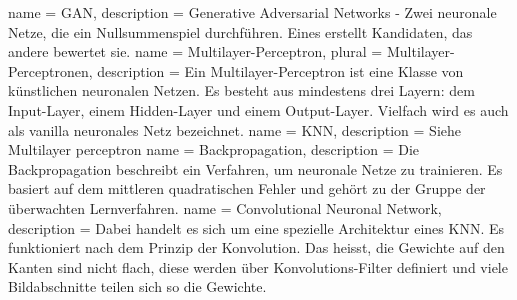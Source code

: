  {
    name = {GAN},
    description = {Generative Adversarial Networks - Zwei neuronale Netze, die ein Nullsummenspiel durchführen.
    Eines erstellt Kandidaten, das andere bewertet sie.\cite{wiki:gan}}
}
 {
    name = {Multilayer-Perceptron},
    plural = {Multilayer-Perceptronen},
    description = {Ein Multilayer-Perceptron ist eine Klasse von künstlichen neuronalen Netzen. Es besteht aus mindestens
    drei Layern: dem Input-Layer, einem Hidden-Layer und einem Output-Layer. Vielfach wird es auch als \glqq vanilla\grqq{}
        neuronales Netz bezeichnet.\cite{wiki:multilayerPerceptron}}
}
 {
    name = {KNN},
    description = {Siehe \Gls{Multilayer perceptron}}
}
 {
    name = {Backpropagation},
    description = {Die Backpropagation beschreibt ein Verfahren, um neuronale Netze zu trainieren. Es basiert auf dem
    mittleren quadratischen Fehler und gehört zu der Gruppe der überwachten Lernverfahren.\cite{wiki:backpropagation}}
}
 {
    name = {Convolutional Neuronal Network},
    description = {Dabei handelt es sich um eine spezielle Architektur eines \Gls{KNN}. Es funktioniert nach dem Prinzip
        der Konvolution. Das heisst, die Gewichte auf den Kanten sind nicht flach, diese werden über Konvolutions-Filter
        definiert und viele Bildabschnitte teilen sich so die Gewichte.\cite{wiki:cnn}}
}
